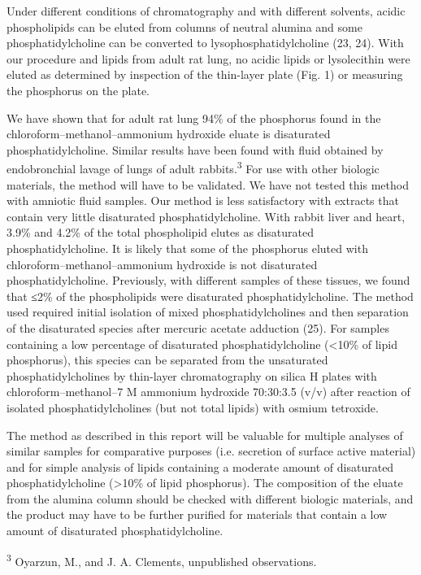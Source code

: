 \documentclass{article}
\begin{document}
Under different conditions of chromatography and with different solvents, acidic phospholipids can be eluted from columns of neutral alumina and some phosphatidylcholine can be converted to lysophosphatidylcholine (23, 24). With our procedure and lipids from adult rat lung, no acidic lipids or lysolecithin were eluted as determined by inspection of the thin-layer plate (Fig. 1) or measuring the phosphorus on the plate.

We have shown that for adult rat lung 94\% of the phosphorus found in the chloroform–methanol–ammonium hydroxide eluate is disaturated phosphatidylcholine. Similar results have been found with fluid obtained by endobronchial lavage of lungs of adult rabbits.\textsuperscript{3} For use with other biologic materials, the method will have to be validated. We have not tested this method with amniotic fluid samples. Our method is less satisfactory with extracts that contain very little disaturated phosphatidylcholine. With rabbit liver and heart, 3.9\% and 4.2\% of the total phospholipid elutes as disaturated phosphatidylcholine. It is likely that some of the phosphorus eluted with chloroform–methanol–ammonium hydroxide is not disaturated phosphatidylcholine. Previously, with different samples of these tissues, we found that ≤2\% of the phospholipids were disaturated phosphatidylcholine. The method used required initial isolation of mixed phosphatidylcholines and then separation of the disaturated species after mercuric acetate adduction (25). For samples containing a low percentage of disaturated phosphatidylcholine (<10\% of lipid phosphorus), this species can be separated from the unsaturated phosphatidylcholines by thin-layer chromatography on silica H plates with chloroform–methanol–7 M ammonium hydroxide 70:30:3.5 (v/v) after reaction of isolated phosphatidylcholines (but not total lipids) with osmium tetroxide.

The method as described in this report will be valuable for multiple analyses of similar samples for comparative purposes (i.e. secretion of surface active material) and for simple analysis of lipids containing a moderate amount of disaturated phosphatidylcholine (>10\% of lipid phosphorus). The composition of the eluate from the alumina column should be checked with different biologic materials, and the product may have to be further purified for materials that contain a low amount of disaturated phosphatidylcholine.

{\small\noindent\textsuperscript{3} Oyarzun, M., and J. A. Clements, unpublished observations.\par}
\end{document}
